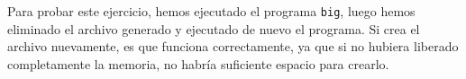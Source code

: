 \par Para probar este ejercicio, hemos ejecutado el programa \texttt{big}, luego
hemos eliminado el archivo generado y ejecutado de nuevo el programa. Si crea
el archivo nuevamente, es que funciona correctamente, ya que si no hubiera liberado
completamente la memoria, no habría suficiente espacio para crearlo. 